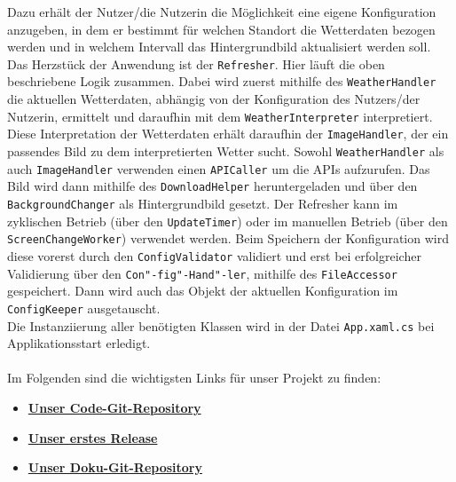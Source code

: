 Dazu erhält der Nutzer/die Nutzerin die Möglichkeit eine eigene Konfiguration anzugeben, in dem er bestimmt für welchen Standort die Wetterdaten bezogen werden und in welchem Intervall das Hintergrundbild aktualisiert werden soll. Das Herzstück der Anwendung ist der \texttt{Refresher}. Hier läuft die oben beschriebene Logik zusammen. Dabei wird zuerst mithilfe des \texttt{WeatherHandler} die aktuellen Wetterdaten, abhängig von der Konfiguration des Nutzers/der Nutzerin, ermittelt und daraufhin mit dem \texttt{WeatherInterpreter} interpretiert. Diese Interpretation der Wetterdaten erhält daraufhin der \texttt{ImageHandler}, der ein passendes Bild zu dem interpretierten Wetter sucht. Sowohl \texttt{WeatherHandler} als auch \texttt{ImageHandler} verwenden einen \texttt{APICaller} um die APIs aufzurufen. Das Bild wird dann mithilfe des \texttt{DownloadHelper} heruntergeladen und über den \texttt{BackgroundChanger} als Hintergrundbild gesetzt. Der Refresher kann im zyklischen Betrieb (über den \texttt{UpdateTimer}) oder im manuellen Betrieb (über den \texttt{ScreenChangeWorker}) verwendet werden. Beim Speichern der Konfiguration wird diese vorerst durch den \texttt{ConfigValidator} validiert und erst bei erfolgreicher Validierung über den \texttt{Con"-fig"-Hand"-ler}, mithilfe des \texttt{FileAccessor} gespeichert. Dann wird auch das Objekt der aktuellen Konfiguration im \texttt{ConfigKeeper} ausgetauscht.\\

\noindent Die Instanziierung aller benötigten Klassen wird in der Datei \texttt{App.xaml.cs} bei Applikationsstart erledigt.\\
\\
Im Folgenden sind die wichtigsten Links für unser Projekt zu finden:
\begin{itemize}
\item \href{https://github.com/Bronzila/WeatherWallpaper}{\color{blue} \textbf{Unser Code-Git-Repository}}
\item \href{https://github.com/Bronzila/WeatherWallpaper/releases/tag/V1}{\color{blue} \textbf{Unser erstes Release}}
\item \href{https://github.com/gierle/WeatherWallpaperDocumentation}{\color{blue} \textbf{Unser Doku-Git-Repository}}
\end{itemize}